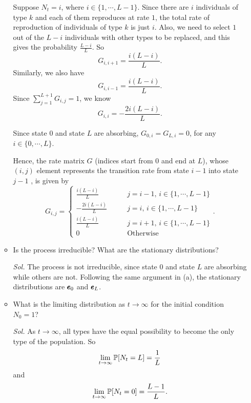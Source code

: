 \begin{enumerate}
\begin{itemize}
            Suppose $N_t = i$, where $i \in \{1, \cdots, L-1\}$. Since there are $i$ individuals of type $k$ and each of them reproduces at rate $1$, the total rate of reproduction of individuals of type $k$ is just $i$. Also, we need to select $1$ out of the $L-i$ individuals with other types to be replaced, and this gives the probability $\frac{L-i}{L}$. So 
            $$G_{i,i+1} = \frac{i(L-i)}{L}.$$
            Similarly, we also have 
            $$G_{i,i-1} = \frac{i(L-i)}{L}.$$
            Since $\sum_{j = 1}^{L+1} G_{i,j} = 1$, we know
            $$G_{i,i} = - \frac{2i(L-i)}{L}.$$

            Since state $0$ and state $L$ are absorbing, $G_{0, i} = G_{L, i} = 0$, for any $i \in \{0, \cdots, L\}$.

            Hence, the rate matrix $G$ (indices start from $0$ and end at $L$), whose $(i,j)$ element represents the transition rate from state $i - 1$ into state $j-1$ , is given by 
            $$
            G_{i,j} = \begin{cases}
                \frac{i(L-i)}{L} \qquad & j = i - 1,\, i \in \{1, \cdots, L-1 \} \\ 
                - \frac{2i(L-i)}{L} \qquad & j = i, \, i \in \{1, \cdots, L-1\} \\
                \frac{i(L-i)}{L} \qquad & j = i + 1,\, i \in \{1, \cdots, L-1 \} \\ 
                0 \qquad & \text{Otherwise}
            \end{cases}.
            $$

            \item Is the process irreducible? What are the stationary distributions?
            
            \textit{ Sol. } The process is not irreducible, since state $0$ and state $L$ are absorbing while others are not. Following the same argument in (a), the stationary distributions are $\pmb{e}_0$ and $\pmb{e}_L$.

            \item What is the limiting distribution as $t \to \infty$ for the initial condition $N_0 = 1$?
            
            \textit{ Sol. } As $t \to \infty$, all types have the equal possibility to become the only type of the population. So 
            $$\lim_{t\to\infty}\mathbb{P}[N_t = L] = \frac{1}{L}$$
            and 
            $$\lim_{t\to\infty}\mathbb{P}[N_t = 0] = \frac{L-1}{L}.$$
        \end{itemize} 
        

\end{enumerate}

